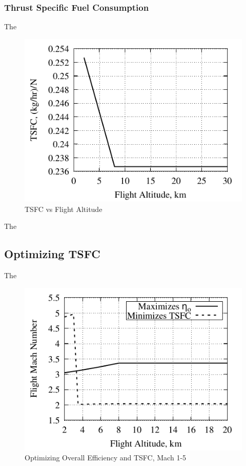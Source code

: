 \documentclass[conf]{new-aiaa} %
\begin{document}
\subsubsection{Thrust Specific Fuel Consumption}
The

\begin{figure}[H] %
    \centering
    \includegraphics[]{media/performance_parameter_files/part_d_TSFC.pdf}
    \caption{\label{fig:partdtsfc}TSFC vs Flight Altitude}
\end{figure}
The

\subsection{Optimizing TSFC} %
The

\begin{figure}[H] %
    \centering
    \includegraphics[]{media/performance_parameter_files/part_e_range_1_5.pdf}
    \caption{\label{fig:parte1-5}Optimizing Overall Efficiency and TSFC, Mach 1-5}
\end{figure}
\end{document}
